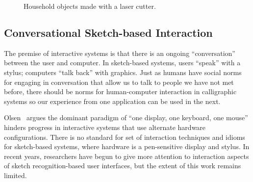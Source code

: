 \documentclass[11pt]{article}
\begin{document}
\begin{figure}
\centering 
{}
\hspace{1cm} 
\caption{Household objects made with a laser cutter.}
\label{fig:flat}
\end{figure}

\subsection{Conversational Sketch-based Interaction}

The premise of interactive systems is that there is an ongoing
``conversation'' between the user and computer. In sketch-based
systems, users ``speak'' with a stylus; computers ``talk back'' with
graphics. Just as humans have social norms for engaging in
conversation that allow us to talk to people we have not met before,
there should be norms for human-computer interaction in calligraphic
systems so our experience from one application can be used in the
next.

Olsen~\cite{olsen-ui-research} argues the dominant paradigm of ``one
display, one keyboard, one mouse'' hinders progress in interactive
systems that use alternate hardware configurations. There is no
standard for set of interaction techniques and idioms for sketch-based
systems, where hardware is a pen-sensitive display and stylus. In
recent years, researchers have begun to give more attention to
interaction aspects of sketch recognition-based user interfaces, but
the extent of this work remains limited.
\end{document}
